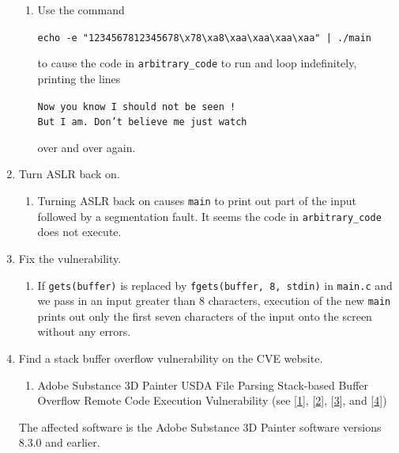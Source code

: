 \documentclass[11pt]{article}
\newcommand{\fn}[1]{\texttt{#1}}
\begin{document}
\begin{enumerate}[left = \parindent, label=\textbf{Task \arabic* -}]
\begin{enumerate}
        \item Use the command \begin{center}
            \fn{echo -e "1234567812345678\textbackslash x78\textbackslash xa8\textbackslash xaa\textbackslash xaa\textbackslash xaa\textbackslash xaa" | ./main}
        \end{center}
        to cause the code in \fn{arbitrary\_code} to run and loop indefinitely, printing the lines
        \begin{center}
            \fn{Now you know I should not be seen !}\\
            \fn{But I am. Don't believe me just watch}
        \end{center}
        over and over again.
    \end{enumerate}
    \item Turn ASLR back on. \begin{enumerate}
        \item Turning ASLR back on causes \fn{main} to print out part of the input followed by a segmentation fault. It seems the code in \fn{arbitrary\_code} does not execute.
    \end{enumerate}
    \item Fix the vulnerability. \begin{enumerate}
        \item If \fn{gets(buffer)} is replaced by \fn{fgets(buffer, 8, stdin)} in \fn{main.c} and we pass in an input greater than $8$ characters, execution of the new \fn{main} prints out only the first seven characters of the input onto the screen without any errors.
    \end{enumerate}
    \item Find a stack buffer overflow vulnerability on the CVE website. \begin{enumerate}[left = \parindent, label=\href{https://cve.mitre.org/cgi-bin/cvename.cgi?name=CVE-2023-29284}{CVE-2023-29284}:] 
    \item Adobe Substance 3D Painter USDA File Parsing Stack-based Buffer Overflow Remote Code Execution Vulnerability (see [\href{https://cve.mitre.org/cgi-bin/cvename.cgi?name=CVE-2023-29284}{1}], [\href{https://www.cve.org/CVERecord?id=CVE-2023-29284}{2}], [\href{https://helpx.adobe.com/security/products/substance3d_painter/apsb23-29.html}{3}], and [\href{https://cwe.mitre.org/data/definitions/121.html}{4}])
    \end{enumerate}
    The affected software is the Adobe Substance 3D Painter software versions 8.3.0 and earlier.


\end{enumerate}
\end{document}
